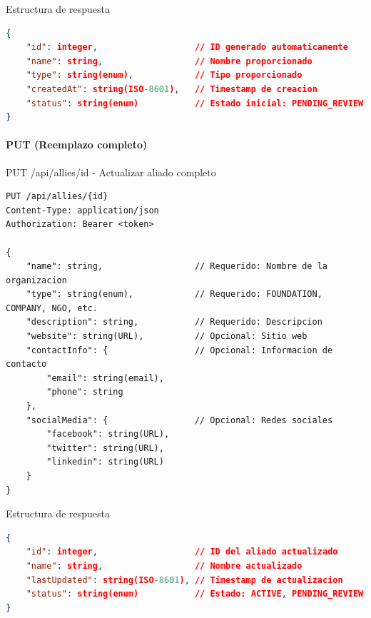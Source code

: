 \documentclass[11pt,a4paper]{article}
\begin{document}
\begin{center}
	\begin{minipage}{\textwidth}
		\begin{codebox}{Estructura de respuesta}
			\begin{lstlisting}[language=json]
{
    "id": integer,                   // ID generado automaticamente
    "name": string,                  // Nombre proporcionado
    "type": string(enum),            // Tipo proporcionado
    "createdAt": string(ISO-8601),   // Timestamp de creacion
    "status": string(enum)           // Estado inicial: PENDING_REVIEW
}
\end{lstlisting}
		\end{codebox}
	\end{minipage}
\end{center}

\paragraph{PUT (Reemplazo completo)}
\begin{center}
	\begin{minipage}{\textwidth}
		\begin{codebox}{PUT /api/allies/{id} - Actualizar aliado completo}
			\begin{lstlisting}[language=HTTP]
PUT /api/allies/{id}
Content-Type: application/json
Authorization: Bearer <token>

{
    "name": string,                  // Requerido: Nombre de la organizacion
    "type": string(enum),            // Requerido: FOUNDATION, COMPANY, NGO, etc.
    "description": string,           // Requerido: Descripcion
    "website": string(URL),          // Opcional: Sitio web
    "contactInfo": {                 // Opcional: Informacion de contacto
        "email": string(email),
        "phone": string
    },
    "socialMedia": {                 // Opcional: Redes sociales
        "facebook": string(URL),
        "twitter": string(URL),
        "linkedin": string(URL)
    }
}
\end{lstlisting}
		\end{codebox}
	\end{minipage}
\end{center}

\begin{center}
	\begin{minipage}{\textwidth}
		\begin{codebox}{Estructura de respuesta}
			\begin{lstlisting}[language=json]
{
    "id": integer,                   // ID del aliado actualizado
    "name": string,                  // Nombre actualizado
    "lastUpdated": string(ISO-8601), // Timestamp de actualizacion
    "status": string(enum)           // Estado: ACTIVE, PENDING_REVIEW, etc.
}
\end{lstlisting}
		\end{codebox}
	\end{minipage}
\end{center}
\end{document}
